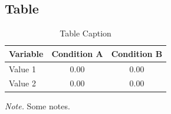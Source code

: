 \subsection{Table}
\begin{table}[htbp]
    \caption{Table Caption\label{tab:table}}
    \centering
    \begin{threeparttable}
        \begin{tabular}{lcc}
            \toprule
            Variable & Condition A & Condition B \\
            \midrule
            Value 1 & 0.00 & 0.00 \\
            Value 2 & 0.00 & 0.00 \\
            \bottomrule
        \end{tabular}
        \begin{tablenotes}
            \small
            \item \textit{Note.} Some notes.
        \end{tablenotes}
    \end{threeparttable}
\end{table}
